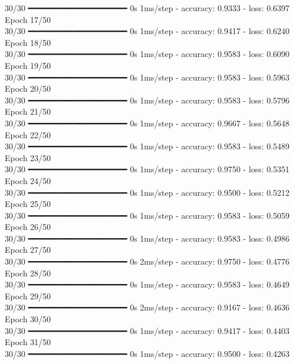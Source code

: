 \documentclass{article}
\begin{document}
30/30 ━━━━━━━━━━━━━━━━━━━━ 0s 1ms/step - accuracy: 0.9333 - loss: 0.6397 \\
Epoch 17/50 \\
30/30 ━━━━━━━━━━━━━━━━━━━━ 0s 1ms/step - accuracy: 0.9417 - loss: 0.6240 \\
Epoch 18/50 \\
30/30 ━━━━━━━━━━━━━━━━━━━━ 0s 1ms/step - accuracy: 0.9583 - loss: 0.6090 \\
Epoch 19/50 \\
30/30 ━━━━━━━━━━━━━━━━━━━━ 0s 1ms/step - accuracy: 0.9583 - loss: 0.5963 \\
Epoch 20/50 \\
30/30 ━━━━━━━━━━━━━━━━━━━━ 0s 1ms/step - accuracy: 0.9583 - loss: 0.5796 \\
Epoch 21/50 \\
30/30 ━━━━━━━━━━━━━━━━━━━━ 0s 1ms/step - accuracy: 0.9667 - loss: 0.5648 \\
Epoch 22/50 \\
30/30 ━━━━━━━━━━━━━━━━━━━━ 0s 1ms/step - accuracy: 0.9583 - loss: 0.5489 \\
Epoch 23/50 \\
30/30 ━━━━━━━━━━━━━━━━━━━━ 0s 1ms/step - accuracy: 0.9750 - loss: 0.5351 \\
Epoch 24/50 \\
30/30 ━━━━━━━━━━━━━━━━━━━━ 0s 1ms/step - accuracy: 0.9500 - loss: 0.5212 \\
Epoch 25/50 \\
30/30 ━━━━━━━━━━━━━━━━━━━━ 0s 1ms/step - accuracy: 0.9583 - loss: 0.5059 \\
Epoch 26/50 \\
30/30 ━━━━━━━━━━━━━━━━━━━━ 0s 1ms/step - accuracy: 0.9583 - loss: 0.4986 \\
Epoch 27/50 \\
30/30 ━━━━━━━━━━━━━━━━━━━━ 0s 2ms/step - accuracy: 0.9750 - loss: 0.4776 \\
Epoch 28/50 \\
30/30 ━━━━━━━━━━━━━━━━━━━━ 0s 1ms/step - accuracy: 0.9583 - loss: 0.4649 \\
Epoch 29/50 \\
30/30 ━━━━━━━━━━━━━━━━━━━━ 0s 2ms/step - accuracy: 0.9167 - loss: 0.4636 \\
Epoch 30/50 \\
30/30 ━━━━━━━━━━━━━━━━━━━━ 0s 1ms/step - accuracy: 0.9417 - loss: 0.4403 \\
Epoch 31/50 \\
30/30 ━━━━━━━━━━━━━━━━━━━━ 0s 1ms/step - accuracy: 0.9500 - loss: 0.4263 \\
\end{document}
